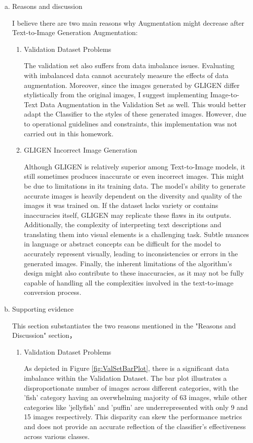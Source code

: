 \documentclass[10pt,a4paper]{article}
\begin{document}
\begin{enumerate}[(a)]
\begin{itemize}
\end{itemize}
\item Reasons and discussion

I believe there are two main reasons why Augmentation might decrease after Text-to-Image Generation Augmentation:
\begin{enumerate}[(1)]
\item Validation Dataset Problems

The validation set also suffers from data imbalance issues. Evaluating with imbalanced data cannot accurately measure the effects of data augmentation. Moreover, since the images generated by GLIGEN differ stylistically from the original images, I suggest implementing Image-to-Text Data Augmentation in the Validation Set as well. This would better adapt the Classifier to the styles of these generated images. However, due to operational guidelines and constraints, this implementation was not carried out in this homework.

\item GLIGEN Incorrect Image Generation

Although GLIGEN is relatively superior among Text-to-Image models, it still sometimes produces inaccurate or even incorrect images. This might be due to limitations in its training data. The model's ability to generate accurate images is heavily dependent on the diversity and quality of the images it was trained on. If the dataset lacks variety or contains inaccuracies itself, GLIGEN may replicate these flaws in its outputs. Additionally, the complexity of interpreting text descriptions and translating them into visual elements is a challenging task. Subtle nuances in language or abstract concepts can be difficult for the model to accurately represent visually, leading to inconsistencies or errors in the generated images. Finally, the inherent limitations of the algorithm's design might also contribute to these inaccuracies, as it may not be fully capable of handling all the complexities involved in the text-to-image conversion process.
\end{enumerate}

\item Supporting evidence

This section substantiates the two reasons mentioned in the "Reasons and Discussion" section，
\begin{enumerate}[(1)]
\item Validation Dataset Problems

As depicted in Figure \ref{fig:ValSetBarPlot}, there is a significant data imbalance within the Validation Dataset. The bar plot illustrates a disproportionate number of images across different categories, with the 'fish' category having an overwhelming majority of 63 images, while other categories like 'jellyfish' and 'puffin' are underrepresented with only 9 and 15 images respectively. This disparity can skew the performance metrics and does not provide an accurate reflection of the classifier's effectiveness across various classes.


\end{enumerate}
\end{enumerate}
\end{document}
